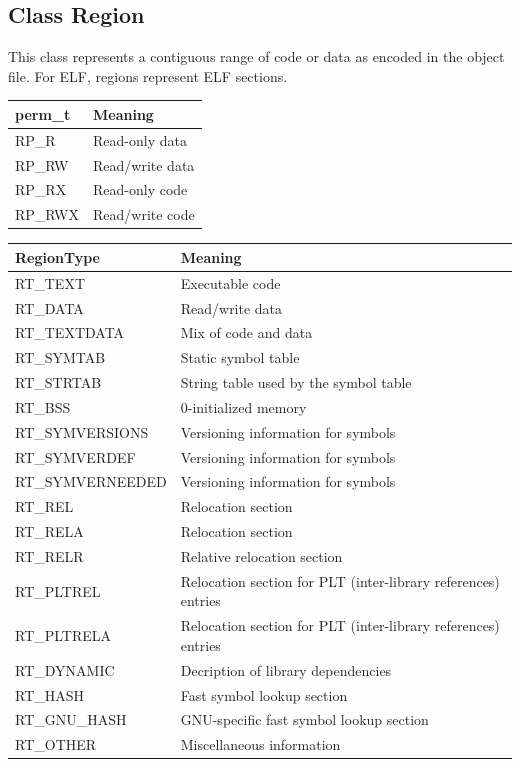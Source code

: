 \subsection{Class Region}

This class represents a contiguous range of code or data as encoded in the object file. For ELF, regions represent ELF sections.

\begin{center}
\begin{tabular}{ll}
\toprule
perm\_t & Meaning \\
\midrule
RP\_R & Read-only data \\
RP\_RW & Read/write data \\
RP\_RX & Read-only code \\
RP\_RWX & Read/write code \\
\bottomrule
\end{tabular}
\end{center}

\begin{center}
\begin{tabular}{ll}
\toprule
RegionType & Meaning \\
\midrule
RT\_TEXT & Executable code \\
RT\_DATA & Read/write data \\
RT\_TEXTDATA & Mix of code and data \\
RT\_SYMTAB & Static symbol table \\
RT\_STRTAB & String table used by the symbol table \\
RT\_BSS & 0-initialized memory \\
RT\_SYMVERSIONS & Versioning information for symbols \\
RT\_SYMVERDEF & Versioning information for symbols \\
RT\_SYMVERNEEDED & Versioning information for symbols \\
RT\_REL & Relocation section \\
RT\_RELA & Relocation section \\
RT\_RELR & Relative relocation section \\
RT\_PLTREL & Relocation section for PLT (inter-library references) entries \\
RT\_PLTRELA & Relocation section for PLT (inter-library references) entries \\
RT\_DYNAMIC & Decription of library dependencies \\
RT\_HASH & Fast symbol lookup section \\
RT\_GNU\_HASH & GNU-specific fast symbol lookup section \\
RT\_OTHER & Miscellaneous information \\
\bottomrule
\end{tabular}
\end{center}


